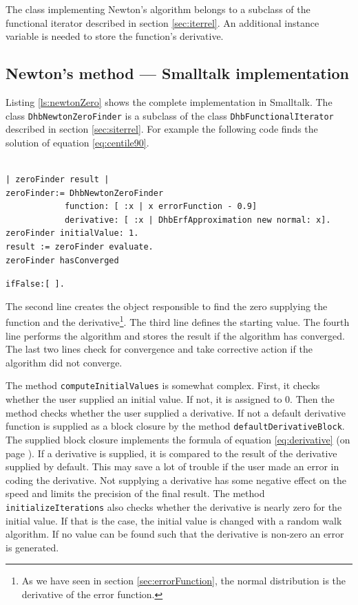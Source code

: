 \documentclass[twoside]{book}
\begin{document}
The class implementing Newton's algorithm belongs to a subclass of
the functional iterator described in section \ref{sec:iterrel}. An
additional instance variable is needed to store the function's
derivative.

\subsection{Newton's method --- Smalltalk implementation}
\label{sec:snewton} Listing \ref{ls:newtonZero} shows the complete
implementation in Smalltalk. The class {\tt DhbNewtonZeroFinder}
is a subclass of the class {\tt DhbFunctionalIterator} described
in section \ref{sec:siterrel}. For example the following code
finds the solution of equation \ref{eq:centile90}.
\begin{codeExample}
\begin{verbatim}

| zeroFinder result |
zeroFinder:= DhbNewtonZeroFinder
            function: [ :x | x errorFunction - 0.9]
            derivative: [ :x | DhbErfApproximation new normal: x].
zeroFinder initialValue: 1.
result := zeroFinder evaluate.
zeroFinder hasConverged
\end{verbatim}
    {\tt ifFalse:[ {\sl <special case processing>}].}
\end{codeExample}
The second line creates the object responsible to find the zero
supplying the function and the derivative\footnote{As we have seen
in section \ref{sec:errorFunction}, the normal distribution is the
derivative of the error function.}. The third line defines the
starting value. The fourth line performs the algorithm and stores
the result if the algorithm has converged. The last two lines
check for convergence and take corrective action if the algorithm
did not converge.

The method {\tt computeInitialValues} is somewhat complex. First,
it checks whether the user supplied an initial value. If not, it
is assigned to 0. Then the method checks whether the user supplied
a derivative. If not a default derivative function is supplied as
a block closure by the method {\tt defaultDerivativeBlock}. The
supplied block closure implements the formula of equation
\ref{eq:derivative} (on page \pageref{eq:derivative}). If a
derivative is supplied, it is compared to the result of the
derivative supplied by default. This may save a lot of trouble if
the user made an error in coding the derivative. Not supplying a
derivative has some negative effect on the speed and limits the
precision of the final result. The method {\tt
initializeIterations} also checks whether the derivative is nearly
zero for the initial value. If that is the case, the initial value
is changed with a random walk algorithm. If no value can be found
such that the derivative is non-zero an error is generated.
\end{document}
